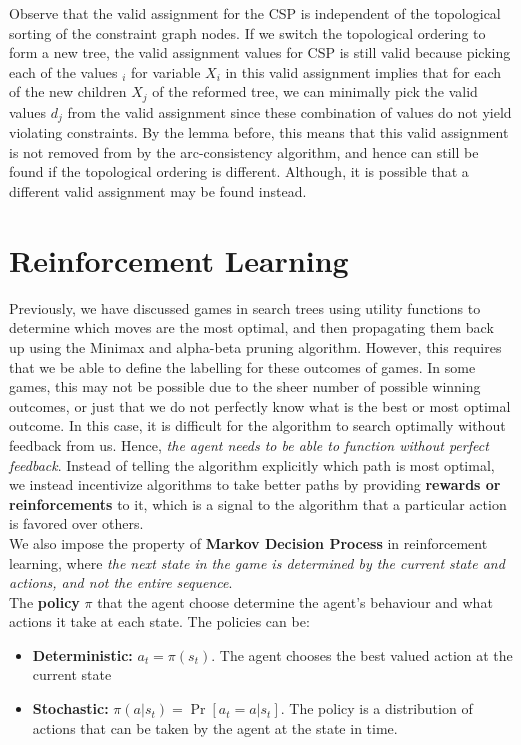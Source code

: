 \documentclass[12pt]{article}
\begin{document}
Observe that the valid assignment for the CSP is independent of the topological sorting of the constraint graph nodes. If we switch the topological ordering to form a new tree, the valid assignment values for CSP is still valid because picking each of the values $_i$ for variable $X_i$ in this valid assignment implies that for each of the new children $X_j$ of the reformed tree, we can minimally pick the valid values $d_j$ from the valid assignment since these combination of values do not yield violating constraints. By the lemma before, this means that this valid assignment is not removed from by the arc-consistency algorithm, and hence can still be found if the topological ordering is different. Although, it is possible that a different valid assignment may be found instead.
\pagebreak

\section{Reinforcement Learning}

Previously, we have discussed games in search trees using utility functions to determine which moves are the most optimal, and then propagating them back up using the Minimax and alpha-beta pruning algorithm. However, this requires that we be able to define the labelling for these outcomes of games. In some games, this may not be possible due to the sheer number of possible winning outcomes, or just that we do not perfectly know what is the best or most optimal outcome. In this case, it is difficult for the algorithm to search optimally without feedback from us. Hence, \textit{the agent needs to be able to function without perfect feedback}. Instead of telling the algorithm explicitly which path is most optimal, we instead incentivize algorithms to take better paths by providing \textbf{rewards or reinforcements} to it, which is a signal to the algorithm that a particular action is favored over others.\\

We also impose the property of \textbf{Markov Decision Process} in reinforcement learning, where \textit{the next state in the game is determined by the current state and actions, and not the entire sequence}.\\

The \textbf{policy} $\pi$ that the agent choose determine the agent's behaviour and what actions it take at each state. The policies can be:

\begin{itemize}
\item \textbf{Deterministic:} $a_t = \pi(s_t)$. The agent chooses the best valued action at the current state
\item \textbf{Stochastic:} $\pi(a | s_t) = \Pr[a_t = a | s_t]$. The policy is a distribution of actions that can be taken by the agent at the state in time. 
\end{itemize}
\end{document}
